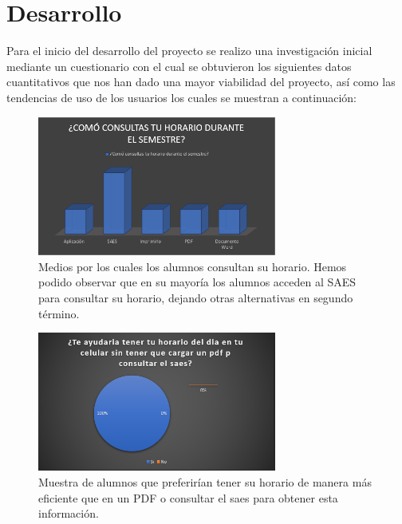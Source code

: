 \documentclass[10pt]{article}
\begin{document}
\section{Desarrollo}
\justify
Para el inicio del desarrollo del proyecto  se realizo una investigación inicial mediante un cuestionario con el cual se obtuvieron los siguientes datos cuantitativos que nos han dado una mayor viabilidad del proyecto, así como las tendencias de uso de los usuarios los cuales se muestran a continuación:

\begin{figure}[H]
    \begin{center}
        \includegraphics[width=0.7\textwidth]{Imagenes/2.PNG}
        \caption{Medios por los cuales los alumnos consultan su horario. Hemos podido observar que en su mayoría los alumnos acceden al SAES para consultar su horario, dejando otras alternativas en segundo término.}
        \label{fig16}
    \end{center}
\end{figure}
\par\vspace{\baselineskip}
\begin{figure}[H]
    \begin{center}
        \includegraphics[width=0.7\textwidth]{Imagenes/3.PNG}
        \caption{Muestra de alumnos que preferirían tener su horario de manera más eficiente que en un PDF o consultar el saes para obtener esta información.}
        \label{fig2}
    \end{center}
\end{figure}
\end{document}
